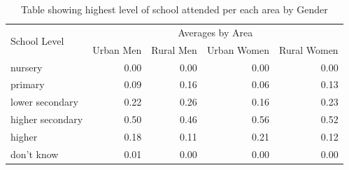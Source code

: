 \documentclass[stu, 12pt, floatsintext,longtable]{apa7}
\begin{document}
\begin{table}[]
    \centering
    \begin{tabular}{@{}lrrrr@{}}
        \toprule
        \multirow{2}{*}{School Level} & \multicolumn{4}{c}{Averages by Area}

        \\
                                      & \multicolumn{1}{l}{Urban Men}        &
        \multicolumn{1}{l}{Rural Men} & \multicolumn{1}{l}{Urban Women}      &
        \multicolumn{1}{l}{Rural Women}
        \\
        \midrule
        nursery                       & 0.00                                 &
        0.00
                                      & 0.00                                 &
        0.00
        \\
        primary                       & 0.09                                 &
        0.16
                                      & 0.06                                 &
        0.13
        \\
        lower secondary               & 0.22                                 &
        0.26
                                      & 0.16                                 &
        0.23
        \\
        higher secondary              & 0.50                                 &
        0.46
                                      & 0.56                                 &
        0.52
        \\
        higher                        & 0.18                                 &
        0.11
                                      & 0.21                                 &
        0.12
        \\
        don't know                    & 0.01                                 &
        0.00
                                      & 0.00                                 &
        0.00
        \\
        \bottomrule
    \end{tabular}
    \caption{Table showing highest level of school attended per each area
        by Gender}
    \label{tab:male_female_average}
\end{table}
\end{document}
